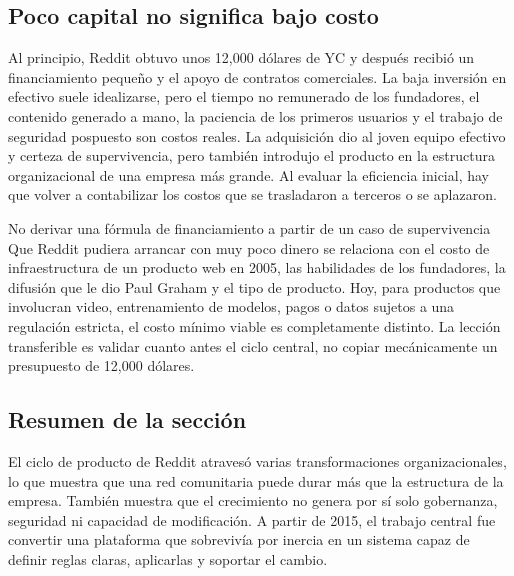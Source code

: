 \subsection{Poco capital no significa bajo costo}

Al principio, Reddit obtuvo unos 12,000 dólares de YC y después recibió un financiamiento pequeño y el apoyo de contratos comerciales. La baja inversión en efectivo suele idealizarse, pero el tiempo no remunerado de los fundadores, el contenido generado a mano, la paciencia de los primeros usuarios y el trabajo de seguridad pospuesto son costos reales. La adquisición dio al joven equipo efectivo y certeza de supervivencia, pero también introdujo el producto en la estructura organizacional de una empresa más grande. Al evaluar la eficiencia inicial, hay que volver a contabilizar los costos que se trasladaron a terceros o se aplazaron.

\begin{warningbox}{No derivar una fórmula de financiamiento a partir de un caso de supervivencia}
Que Reddit pudiera arrancar con muy poco dinero se relaciona con el costo de infraestructura de un producto web en 2005, las habilidades de los fundadores, la difusión que le dio Paul Graham y el tipo de producto. Hoy, para productos que involucran video, entrenamiento de modelos, pagos o datos sujetos a una regulación estricta, el costo mínimo viable es completamente distinto. La lección transferible es validar cuanto antes el ciclo central, no copiar mecánicamente un presupuesto de 12,000 dólares.
\end{warningbox}

\subsection{Resumen de la sección}

El ciclo de producto de Reddit atravesó varias transformaciones organizacionales, lo que muestra que una red comunitaria puede durar más que la estructura de la empresa. También muestra que el crecimiento no genera por sí solo gobernanza, seguridad ni capacidad de modificación. A partir de 2015, el trabajo central fue convertir una plataforma que sobrevivía por inercia en un sistema capaz de definir reglas claras, aplicarlas y soportar el cambio.
